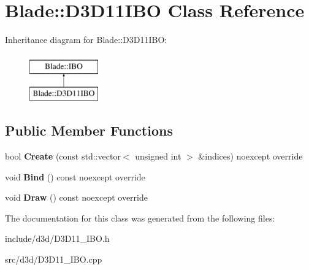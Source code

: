 \hypertarget{class_blade_1_1_d3_d11_i_b_o}{}\section{Blade\+:\+:D3\+D11\+I\+BO Class Reference}
\label{class_blade_1_1_d3_d11_i_b_o}
Inheritance diagram for Blade\+:\+:D3\+D11\+I\+BO\+:\begin{figure}[H]
\begin{center}
\leavevmode
\includegraphics[height=2.000000cm]{class_blade_1_1_d3_d11_i_b_o}
\end{center}
\end{figure}
\subsection*{Public Member Functions}
\begin{DoxyCompactItemize}
\item 
\mbox{\label{class_blade_1_1_d3_d11_i_b_o_acd953542448c159a16a7a65ddbf3ea7a}} 
bool {\bfseries Create} (const std\+::vector$<$ unsigned int $>$ \&indices) noexcept override
\item 
\mbox{\label{class_blade_1_1_d3_d11_i_b_o_ad2275cac4f7f7d50dbdd760dc7e22a63}} 
void {\bfseries Bind} () const noexcept override
\item 
\mbox{\label{class_blade_1_1_d3_d11_i_b_o_adb15e836bb5627e05a3cd30e377ec5f3}} 
void {\bfseries Draw} () const noexcept override
\end{DoxyCompactItemize}


The documentation for this class was generated from the following files\+:\begin{DoxyCompactItemize}
\item 
include/d3d/D3\+D11\+\_\+\+I\+B\+O.\+h\item 
src/d3d/D3\+D11\+\_\+\+I\+B\+O.\+cpp\end{DoxyCompactItemize}
